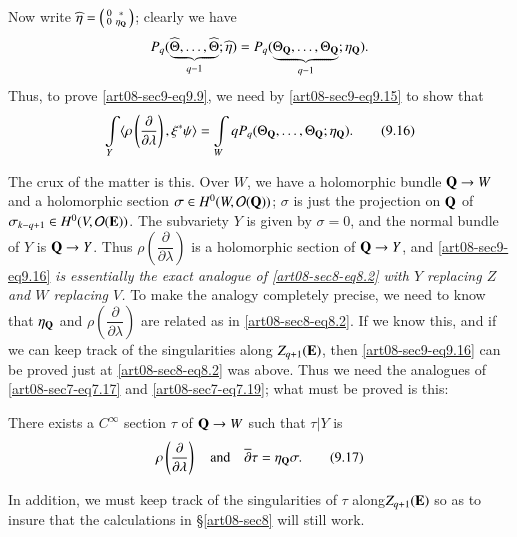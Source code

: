 Now write $\widehat{\eta}=\left(\begin{smallmatrix} 0 & *\\ 0 & \eta_{\mathbf{Q}}\end{smallmatrix}\right)$; clearly we have 
$$
P_{q}(\underbrace{\widehat{\Theta},\ldots,\widehat{\Theta}}_{q-1};\widehat{\eta})=P_{q}(\underbrace{\Theta_{\mathbf{Q}},\ldots,\Theta_{\mathbf{Q}}}_{q-1};\eta_{\mathbf{Q}}).
$$ 
Thus, to prove \eqref{art08-sec9-eq9.9}, we need by \eqref{art08-sec9-eq9.15} to show that
\begin{equation*}
\int\limits_{Y}\langle \rho\left(\dfrac{\partial}{\partial\lambda}\right), \xi^{*}\psi\rangle = \int\limits_{W}qP_{q}(\Theta_{\mathbf{Q}},\ldots,\Theta_{\mathbf{Q}};\eta_{\mathbf{Q}}).\tag{9.16}\label{art08-sec9-eq9.16}
\end{equation*}

The crux of the matter is this. Over $W$, we have a holomorphic bundle $\mathbf{Q}\to W$ and a holomorphic section $\sigma\in H^{0}(W,\mathcal{O}(\mathbf{Q}))$; $\sigma$ is just the projection on $\mathbf{Q}$ of $\sigma_{k-q+1}\in H^{0}(V,\mathcal{O}(\mathbf{E}))$. The subvariety $Y$ is given by $\sigma=0$, and the normal bundle of $Y$ is $\mathbf{Q}\to Y$. Thus $\rho\left(\dfrac{\partial}{\partial\lambda}\right)$ is a holomorphic section of $\mathbf{Q}\to Y$, and \eqref{art08-sec9-eq9.16} {\em is essentially the exact analogue of \eqref{art08-sec8-eq8.2} with $Y$ replacing $Z$ and $W$ replacing $V$.} To make the analogy completely precise, we need to know that $\eta_{\mathbf{Q}}$ and $\rho\left(\dfrac{\partial}{\partial\lambda}\right)$ are related as in \eqref{art08-sec8-eq8.2}. If we know this, and if we can keep track of the singularities along $Z_{q+1}(\mathbf{E})$, then \eqref{art08-sec9-eq9.16} can be proved just at \eqref{art08-sec8-eq8.2} was above. Thus we need the analogues of \eqref{art08-sec7-eq7.17} and \eqref{art08-sec7-eq7.19}; what must be proved is this:

There exists a $C^{\infty}$ section $\tau$ of $\mathbf{Q}\to W$ such that $\tau|Y$ is
\begin{equation*}
\rho\left(\frac{\partial}{\partial\lambda}\right)\quad\text{and}\quad \overline{\partial}\tau=\eta_{\mathbf{Q}}\sigma.\tag{9.17}\label{art08-sec9-eq9.17}
\end{equation*}

In addition, we must keep track of the singularities of $\tau$ along\break $Z_{q+1}(\mathbf{E})$ so as to insure that the calculations in \S\ref{art08-sec8} will still work.

